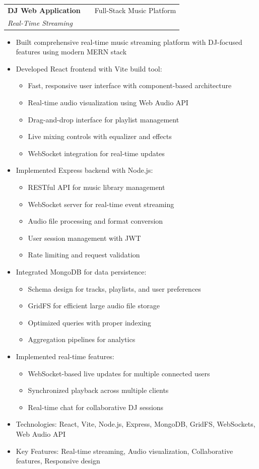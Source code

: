 \documentclass[a4paper,12pt]{article}
\makeatletter
\newenvironment{projectdetailed}[3]
    {
    \begin{tabularx}{\linewidth}{@{}l X r@{}}
    \textbf{#1} & \hfill & #2 \\
    \textit{#3} & & \\[3.75pt]
    \end{tabularx}
    \begin{minipage}[t]{\linewidth}
    \begin{itemize}[nosep,after=\strut, leftmargin=1em, itemsep=2pt,label=--]
    }
    {
    \end{itemize}
    \end{minipage}
    \vspace{6pt}
    }
\makeatother
\begin{document}
\begin{projectdetailed}{DJ Web Application}{Full-Stack Music Platform}{Real-Time Streaming}
\item Built comprehensive real-time music streaming platform with DJ-focused features using modern MERN stack
\item Developed React frontend with Vite build tool:
\begin{itemize}[nosep, leftmargin=2em]
    \item Fast, responsive user interface with component-based architecture
    \item Real-time audio visualization using Web Audio API
    \item Drag-and-drop interface for playlist management
    \item Live mixing controls with equalizer and effects
    \item WebSocket integration for real-time updates
\end{itemize}
\item Implemented Express backend with Node.js:
\begin{itemize}[nosep, leftmargin=2em]
    \item RESTful API for music library management
    \item WebSocket server for real-time event streaming
    \item Audio file processing and format conversion
    \item User session management with JWT
    \item Rate limiting and request validation
\end{itemize}
\item Integrated MongoDB for data persistence:
\begin{itemize}[nosep, leftmargin=2em]
    \item Schema design for tracks, playlists, and user preferences
    \item GridFS for efficient large audio file storage
    \item Optimized queries with proper indexing
    \item Aggregation pipelines for analytics
\end{itemize}
\item Implemented real-time features:
\begin{itemize}[nosep, leftmargin=2em]
    \item WebSocket-based live updates for multiple connected users
    \item Synchronized playback across multiple clients
    \item Real-time chat for collaborative DJ sessions
\end{itemize}
\item Technologies: React, Vite, Node.js, Express, MongoDB, GridFS, WebSockets, Web Audio API
\item Key Features: Real-time streaming, Audio visualization, Collaborative features, Responsive design
\end{projectdetailed}
\end{document}
